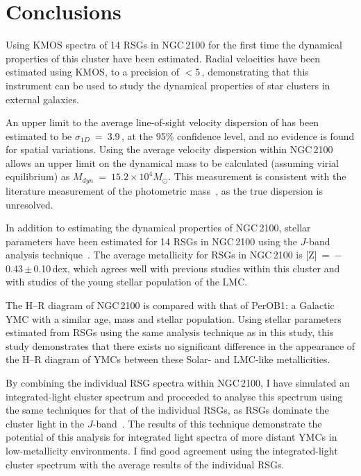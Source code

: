 
\section{Conclusions} %
\label{sec:ngc2100conc}

Using KMOS spectra of 14 RSGs in NGC\,2100 for the first time the dynamical properties of this cluster have been estimated.
Radial velocities have been estimated using KMOS, to a precision of $<5$\,\kms, demonstrating that this instrument can be used to study the dynamical properties of star clusters in external galaxies.

An upper limit to the average line-of-sight velocity dispersion of has been estimated to be $\sigma_{1D}$~=~3.9\,\kms, at the 95\% confidence level, and no evidence is found for spatial variations.
Using the average velocity dispersion within NGC\,2100 allows an upper limit on the dynamical mass to be calculated
(assuming virial equilibrium) as $M_{dyn}$~=~$15.2\times 10^{4}M_{\odot}$.
This measurement is consistent with the literature measurement of the photometric mass~\citep{2005ApJS..161..304M}, as the true dispersion is unresolved.

In addition to estimating the dynamical properties of NGC\,2100,
stellar parameters have been estimated for 14 RSGs in NGC\,2100 using the $J$-band analysis technique~\citep{2010MNRAS.407.1203D}.
The average metallicity for RSGs in NGC\,2100 is [Z]~=~$-$0.43\,$\pm$\,0.10\,dex, which agrees well with previous studies within this cluster and with studies of the young stellar population of the LMC.

The H--R diagram of NGC\,2100 is compared with that of PerOB1: a Galactic YMC with a similar age, mass and stellar population.
Using stellar parameters estimated from RSGs using the same analysis technique as in this study,
this study demonstrates that there exists no significant difference in the appearance of the H--R diagram of YMCs between these Solar- and LMC-like metallicities.

By combining the individual RSG spectra within NGC\,2100, I have simulated an integrated-light cluster spectrum and proceeded to analyse this spectrum using the same techniques for that of the individual RSGs, as RSGs dominate the cluster light in the $J$-band~\citep{2013MNRAS.430L..35G}.
The results of this technique demonstrate the potential of this analysis for integrated light spectra of more distant YMCs in low-metallicity environments.
I find good agreement using the integrated-light cluster spectrum with the average results of the individual RSGs.


